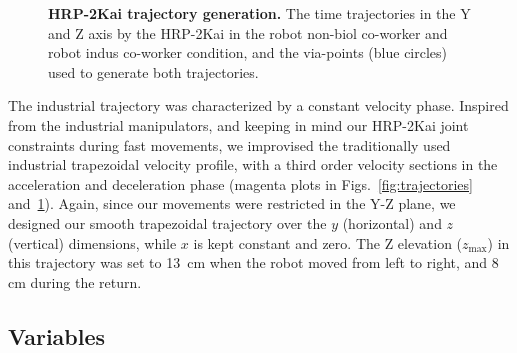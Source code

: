 \begin{figure}[hpt]
	\caption{{\bf HRP-2Kai trajectory generation.} The time trajectories in the Y and Z axis by the HRP-2Kai in the robot non-biol co-worker and robot indus co-worker condition, and the via-points (blue circles) used to generate both trajectories.}
	\label{fig:trajectories2}
\end{figure}


The industrial trajectory was characterized by a constant velocity phase. Inspired from the industrial manipulators, and keeping in mind our HRP-2Kai joint constraints during fast movements, we improvised the traditionally used industrial trapezoidal velocity profile, with a third order velocity sections in the acceleration and deceleration phase (magenta plots in Figs.~\ref{fig:trajectories} and~\ref{fig:trajectories2}). Again, since our movements were restricted in the Y-Z plane, we designed our smooth trapezoidal trajectory over the $y$ (horizontal) and $z$ (vertical) dimensions, while $x$ is kept constant and zero. The Z elevation ($z_{\max}$) in this trajectory was set to 13~cm when the robot moved from left to right, and 8 cm during the return.


\subsection{Variables}

